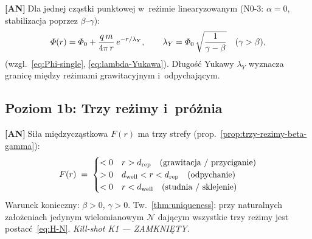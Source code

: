 \begin{chain}\label{chain:A5}
  \textbf{[AN]}$\;$Dla jednej cz\k{a}stki punktowej w~re\.zimie
  linearyzowanym (N0-3: $\alpha = 0$, stabilizacja poprzez
  $\beta$--$\gamma$):
  \begin{equation}\label{eq:H-Yukawa}
    \varPhi(r) = \varPhi_0 + \frac{q\,m}{4\pi\,r}\,e^{-r/\lambda_Y},
    \qquad
    \lambda_Y = \varPhi_0\,\sqrt{\frac{1}{\gamma - \beta}}
    \quad (\gamma > \beta),
  \end{equation}
  (wzgl.~\eqref{eq:Phi-single}, \eqref{eq:lambda-Yukawa}).
  D\l{}ugo\'s\'c Yukawy $\lambda_Y$ wyznacza granic\k{e} mi\k{e}dzy
  re\.zimami grawitacyjnym i~odpychaj\k{a}cym.
\end{chain}

\subsection{Poziom 1b: Trzy re\.zimy i~pr\'o\.znia}%
\label{app:H-rezimy}

\begin{chain}\label{chain:A6}
  \textbf{[AN]}$\;$Si\l{}a mi\k{e}dzycz\k{a}stkowa $F(r)$
  ma trzy strefy (prop.~\ref{prop:trzy-rezimy-beta-gamma}):
  \begin{equation}\label{eq:H-force}
    F(r) \;=\;
    \begin{cases}
      < 0 & r > d_{\mathrm{rep}} \quad\text{(grawitacja / przyci\k{a}ganie)} \\
      > 0 & d_{\mathrm{well}} < r < d_{\mathrm{rep}} \quad\text{(odpychanie)} \\
      < 0 & r < d_{\mathrm{well}} \quad\text{(studnia / sklejenie)}
    \end{cases}
  \end{equation}
  Warunek konieczny: $\beta > 0$, $\gamma > 0$.
  Tw.~\ref{thm:uniqueness}: przy naturalnych za\l{}o\.zeniach
  jedynym wielomianowym $\mathcal{N}$ daj\k{a}cym wszystkie trzy
  re\.zimy jest postac\'c~\eqref{eq:H-N}.
  \emph{Kill-shot K1 --- ZAMKNI\k{E}TY.}
\end{chain}

